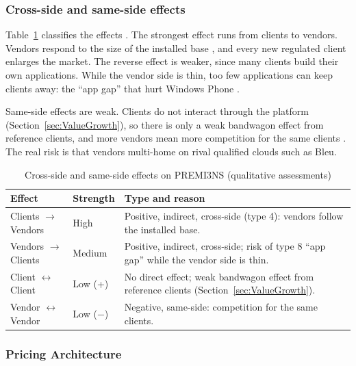 \subsubsection{Cross-side and same-side effects}

Table~\ref{tab:effects} classifies the effects \parencite[slides 14--23]{windekilde2026msp}. The strongest effect runs from clients to vendors. Vendors respond to the size of the installed base \parencite[slide 19]{windekilde2026msp}, and every new regulated client enlarges the market. The reverse effect is weaker, since many clients build their own applications. While the vendor side is thin, too few applications can keep clients away: the ``app gap'' that hurt Windows Phone \parencite[slide 23]{windekilde2026msp}.

Same-side effects are weak. Clients do not interact through the platform (Section~\ref{sec:ValueGrowth}), so there is only a weak bandwagon effect from reference clients, and more vendors mean more competition for the same clients \parencite[slide 40]{windekilde2026msp}. The real risk is that vendors multi-home on rival qualified clouds such as Bleu.

\begin{table}[htbp]
\centering
\begin{tabular}{|p{3.3cm}|p{1.8cm}|p{7.9cm}|}
\hline
\textbf{Effect} & \textbf{Strength} & \textbf{Type and reason} \\ \hline
Clients $\rightarrow$ Vendors & High & Positive, indirect, cross-side (type 4): vendors follow the installed base. \\ \hline
Vendors $\rightarrow$ Clients & Medium & Positive, indirect, cross-side; risk of type 8 ``app gap'' while the vendor side is thin. \\ \hline
Client $\leftrightarrow$ Client & Low (+) & No direct effect; weak bandwagon effect from reference clients (Section~\ref{sec:ValueGrowth}). \\ \hline
Vendor $\leftrightarrow$ Vendor & Low ($-$) & Negative, same-side: competition for the same clients. \\ \hline
\end{tabular}
\caption{Cross-side and same-side effects on PREMI3NS (qualitative assessments)}
\label{tab:effects}
\end{table}

\subsubsection{Pricing Architecture}

